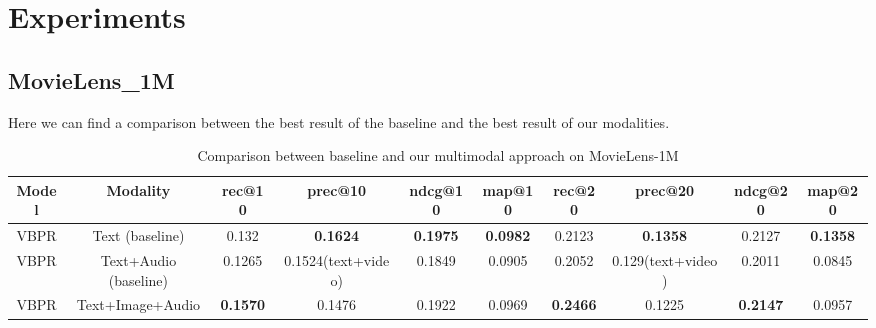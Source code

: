 \section{Experiments}
\subsection{MovieLens\_1M}
Here we can find a comparison between the best result of the baseline \cite{Spillong} and the best result of our modalities.
\begin{table}[H]
    \centering
    \begin{adjustbox}{max width=\textwidth}
    \begin{tabular}{|c|c|c|c|c|c|c|c|c|c|}
        \hline
        \textbf{Model} & \textbf{Modality} & \textbf{rec@10} & \textbf{prec@10} & \textbf{ndcg@10} & \textbf{map@10} & \textbf{rec@20} & \textbf{prec@20} & \textbf{ndcg@20} & \textbf{map@20} \\
        \hline
        VBPR & Text (baseline) & 0.132 & \textbf{0.1624} & \textbf{0.1975} & \textbf{0.0982} & 0.2123 & \textbf{0.1358} & 0.2127 & \textbf{0.1358} \\
        \hline
        VBPR & Text+Audio (baseline) & 0.1265 & 0.1524(text+video) & 0.1849 & 0.0905 & 0.2052 & 0.129(text+video) & 0.2011 & 0.0845 \\
        \hline
        VBPR & Text+Image+Audio & \textbf{0.1570} & 0.1476 & 0.1922 & 0.0969 & \textbf{0.2466} & 0.1225 & \textbf{0.2147} & 0.0957 \\
        \hline
    \end{tabular}
    \end{adjustbox}
    \caption{Comparison between baseline and our multimodal approach on MovieLens-1M}
    \label{tab:vbpr_movielens_comparison}
\end{table}
